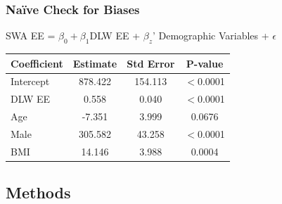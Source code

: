 \documentclass[handout]{beamer}\usepackage[]{graphicx}\usepackage[]{color}
\begin{document}
\begin{frame}
\frametitle{Na{\"i}ve Check for Biases}

SWA EE = $\beta_0 + \beta_1$DLW EE + $\beta_z$' Demographic Variables + $\epsilon$ \\


\vspace{0.3cm}

\begin{table} \centering 
\begin{tabular}{l|ccc}
\hline
Coefficient & Estimate & Std Error & P-value \\
\hline
Intercept & 878.422 & 154.113 & $<$0.0001 \\
DLW EE & 0.558 & 0.040 & $<$0.0001 \\
Age & -7.351 & 3.999 & 0.0676 \\
Male & 305.582 & 43.258 & $<$0.0001 \\
BMI & 14.146 & 3.988 & 0.0004 \\
\hline
\end{tabular} 
\end{table} 
\end{frame}


\subsection{Methods}
\end{document}

